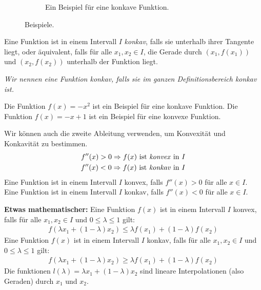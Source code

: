 \documentclass[12pt]{article}
\newenvironment{definition}[2][Definition]{\begin{trivlist}
        \item[\hskip \labelsep {\bfseries #1}\hskip \labelsep {\bfseries #2.}]}{\flushright{$\square$}\end{trivlist}}
\begin{document}
\begin{definition}{[Konkavität und Konvexität]}
\begin{figure}[ht]
\begin{subfigure}[t]{0.4\textwidth}
                        \caption{Ein Beispiel für eine konkave Funktion.}
                \end{subfigure}
                \caption{Beispiele.}
        \end{figure}

        Eine Funktion ist in einem Intervall $I$ \textit{konkav}, falls sie unterhalb
        ihrer Tangente liegt, oder äquivalent, falls für alle $x_1,x_2\in I$, die
        Gerade durch $(x_1,f(x_1))$ und $(x_2,f(x_2))$ unterhalb der Funktion liegt.

        \textit{Wir nennen eine Funktion konkav, falls sie im ganzen Definitionsbereich konkav ist.}

        Die Funktion $f(x)=-x^2$ ist ein Beispiel für eine konkave Funktion. Die
        Funktion $f(x)=-x+1$ ist ein Beispiel für eine konvexe Funktion.

        Wir können auch die zweite Ableitung verwenden, um Konvexität und Konkavität zu
        bestimmen.
        \begin{align*}
                f''(x)>0\Rightarrow f(x)\text{ ist \textit{konvex} in }I \\
                f''(x)<0\Rightarrow f(x)\text{ ist \textit{konkav} in }I
        \end{align*}
        Eine Funktion ist in einem Intervall $I$ konvex, falls $f''(x)> 0$ für alle $x\in I$. Eine Funktion ist in einem Intervall $I$ konkav, falls $f''(x)< 0$ für alle $x\in I$.

        \textbf{Etwas mathematischer:}
        Eine Funktion $f(x)$ ist in einem Intervall $I$ konvex, falls für alle $x_1,x_2\in I$ und $0\leq\lambda\leq 1$ gilt:
        \begin{align}
                f(\lambda x_1+(1-\lambda)x_2)\leq\lambda f(x_1)+(1-\lambda)f(x_2)
        \end{align}
        Eine Funktion $f(x)$ ist in einem Intervall $I$ konkav, falls für alle $x_1,x_2\in I$ und $0\leq\lambda\leq 1$ gilt:
        \begin{align}
                f(\lambda x_1+(1-\lambda)x_2)\geq\lambda f(x_1)+(1-\lambda)f(x_2)
        \end{align}
        Die funktionen $l(\lambda)=\lambda x_1+(1-\lambda)x_2$ sind lineare Interpolationen (also Geraden) durch $x_1$ und $x_2$.
\end{definition}
\end{document}
